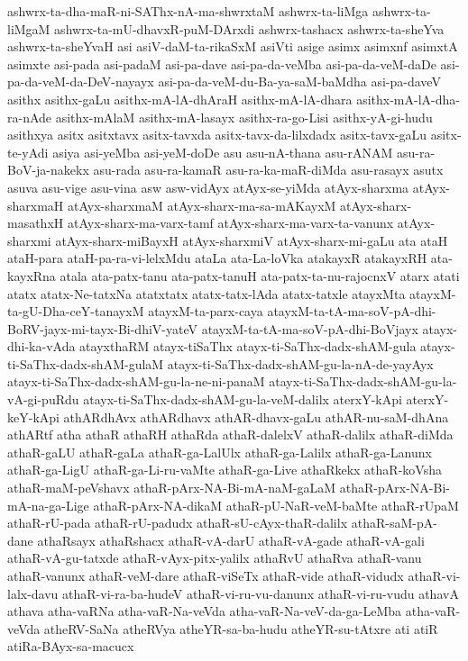 {ashwrx-ta-dha-maR-ni-SAThx-nA-ma-shwrxtaM
ashwrx-ta-liMga
ashwrx-ta-liMgaM
ashwrx-ta-mU-dhavxR-puM-DArxdi
ashwrx-tashacx
ashwrx-ta-sheYva
ashwrx-ta-sheYvaH
asi
asiV-daM-ta-rikaSxM
asiVti
asige
asimx
asimxnf
asimxtA
asimxte
asi-pada
asi-padaM
asi-pa-dave
asi-pa-da-veMba
asi-pa-da-veM-daDe
asi-pa-da-veM-da-DeV-nayayx
asi-pa-da-veM-du-Ba-ya-saM-baMdha
asi-pa-daveV
asithx
asithx-gaLu
asithx-mA-lA-dhAraH
asithx-mA-lA-dhara
asithx-mA-lA-dha-ra-nAde
asithx-mAlaM
asithx-mA-lasayx
asithx-ra-go-Lisi
asithx-yA-gi-hudu
asithxya
asitx
asitxtavx
asitx-tavxda
asitx-tavx-da-lilxdadx
asitx-tavx-gaLu
asitx-te-yAdi
asiya
asi-yeMba
asi-yeM-doDe
asu
asu-nA-thana
asu-rANAM
asu-ra-BoV-ja-nakekx
asu-rada
asu-ra-kamaR
asu-ra-ka-maR-diMda
asu-rasayx
asutx
asuva
asu-vige
asu-vina
asw
asw-vidAyx
atAyx-se-yiMda
atAyx-sharxma
atAyx-sharxmaH
atAyx-sharxmaM
atAyx-sharx-ma-sa-mAKayxM
atAyx-sharx-masathxH
atAyx-sharx-ma-varx-tamf
atAyx-sharx-ma-varx-ta-vanunx
atAyx-sharxmi
atAyx-sharx-miBayxH
atAyx-sharxmiV
atAyx-sharx-mi-gaLu
ata
ataH
ataH-para
ataH-pa-ra-vi-lelxMdu
ataLa
ata-La-loVka
atakayxR
atakayxRH
ata-kayxRna
atala
ata-patx-tanu
ata-patx-tanuH
ata-patx-ta-nu-rajocnxV
atarx
atati
atatx
atatx-Ne-tatxNa
atatxtatx
atatx-tatx-lAda
atatx-tatxle
atayxMta
atayxM-ta-gU-Dha-ceY-tanayxM
atayxM-ta-parx-caya
atayxM-ta-tA-ma-soV-pA-dhi-BoRV-jayx-mi-tayx-Bi-dhiV-yateV
atayxM-ta-tA-ma-soV-pA-dhi-BoVjayx
atayx-dhi-ka-vAda
atayxthaRM
atayx-tiSaThx
atayx-ti-SaThx-dadx-shAM-gula
atayx-ti-SaThx-dadx-shAM-gulaM
atayx-ti-SaThx-dadx-shAM-gu-la-nA-de-yayAyx
atayx-ti-SaThx-dadx-shAM-gu-la-ne-ni-panaM
atayx-ti-SaThx-dadx-shAM-gu-la-vA-gi-puRdu
atayx-ti-SaThx-dadx-shAM-gu-la-veM-dalilx
aterxY-kApi
aterxY-keY-kApi
athARdhAvx
athARdhavx
athAR-dhavx-gaLu
athAR-nu-saM-dhAna
athARtf
atha
athaR
athaRH
athaRda
athaR-dalelxV
athaR-dalilx
athaR-diMda
athaR-gaLU
athaR-gaLa
athaR-ga-LalUlx
athaR-ga-Lalilx
athaR-ga-Lanunx
athaR-ga-LigU
athaR-ga-Li-ru-vaMte
athaR-ga-Live
athaRkekx
athaR-koVsha
athaR-maM-peVshavx
athaR-pArx-NA-Bi-mA-naM-gaLaM
athaR-pArx-NA-Bi-mA-na-ga-Lige
athaR-pArx-NA-dikaM
athaR-pU-NaR-veM-baMte
athaR-rUpaM
athaR-rU-pada
athaR-rU-padudx
athaR-sU-cAyx-thaR-dalilx
athaR-saM-pA-dane
athaRsayx
athaRshacx
athaR-vA-darU
athaR-vA-gade
athaR-vA-gali
athaR-vA-gu-tatxde
athaR-vAyx-pitx-yalilx
athaRvU
athaRva
athaR-vanu
athaR-vanunx
athaR-veM-dare
athaR-viSeTx
athaR-vide
athaR-vidudx
athaR-vi-lalx-davu
athaR-vi-ra-ba-hudeV
athaR-vi-ru-vu-danunx
athaR-vi-ru-vudu
athavA
athava
atha-vaRNa
atha-vaR-Na-veVda
atha-vaR-Na-veV-da-ga-LeMba
atha-vaR-veVda
atheRV-SaNa
atheRVya
atheYR-sa-ba-hudu
atheYR-su-tAtxre
ati
atiR
atiRa-BAyx-sa-macucx
}
